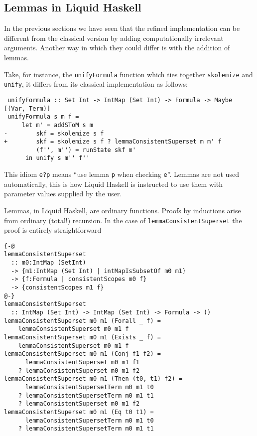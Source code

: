 \documentclass[sigconf]{acmart}
\newcommand{\tc}[1]{{\small\texttt{#1}}}
\begin{document}

\subsection{Lemmas in Liquid Haskell}
\label{sec:lh-lemmas}

In the previous sections we have seen that the refined implementation can be
different from the classical version by adding computationally irrelevant
arguments. Another way in which they could differ is with the addition of lemmas.

Take, for instance, the \tc{unifyFormula} function which ties together
\tc{skolemize} and \tc{unify}, it differs from its classical implementation as
follows:

\begin{verbatim}
 unifyFormula :: Set Int -> IntMap (Set Int) -> Formula -> Maybe [(Var, Term)]
 unifyFormula s m f =
     let m' = addSToM s m
-        skf = skolemize s f
+        skf = skolemize s f ? lemmaConsistentSuperset m m' f
         (f'', m'') = runState skf m'
      in unify s m'' f''
\end{verbatim}

This idiom \tc{e?p} means ``use lemma \tc{p} when checking \tc{e}''.
Lemmas are not used automatically, this is how Liquid
Haskell is instructed to use them with parameter values supplied by the user.

Lemmas, in Liquid Haskell, are ordinary functions. Proofs by inductions arise
from ordinary (total!) recursion. In the case of \tc{lemmaConsistentSuperset}
the proof is entirely straightforward

\begin{verbatim}
{-@
lemmaConsistentSuperset
  :: m0:IntMap (SetInt)
  -> {m1:IntMap (Set Int) | intMapIsSubsetOf m0 m1}
  -> {f:Formula | consistentScopes m0 f}
  -> {consistentScopes m1 f}
@-}
lemmaConsistentSuperset
  :: IntMap (Set Int) -> IntMap (Set Int) -> Formula -> ()
lemmaConsistentSuperset m0 m1 (Forall _ f) =
    lemmaConsistentSuperset m0 m1 f
lemmaConsistentSuperset m0 m1 (Exists _ f) =
    lemmaConsistentSuperset m0 m1 f
lemmaConsistentSuperset m0 m1 (Conj f1 f2) =
      lemmaConsistentSuperset m0 m1 f1
    ? lemmaConsistentSuperset m0 m1 f2
lemmaConsistentSuperset m0 m1 (Then (t0, t1) f2) =
      lemmaConsistentSupersetTerm m0 m1 t0
    ? lemmaConsistentSupersetTerm m0 m1 t1
    ? lemmaConsistentSuperset m0 m1 f2
lemmaConsistentSuperset m0 m1 (Eq t0 t1) =
      lemmaConsistentSupersetTerm m0 m1 t0
    ? lemmaConsistentSupersetTerm m0 m1 t1
\end{verbatim}
\end{document}
